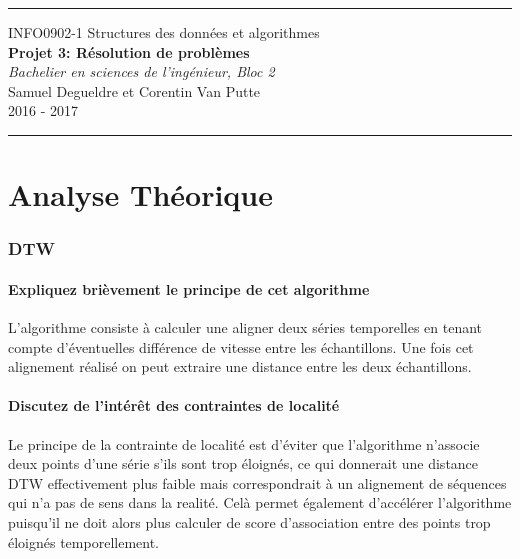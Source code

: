 \documentclass[a4paper,11pt]{article}
\begin{document}
\setcounter{page}{1}


\begin{center}


\rule{\linewidth}{0.3mm}
\LARGE
INFO0902-1 Structures des données et algorithmes\\
\vspace{0.3cm}
\large
\textbf{Projet 3: Résolution de problèmes}\\
\vspace{0.3cm}
\normalsize
\textit{Bachelier en sciences de l'ingénieur, Bloc 2}\\
\vspace{0.2cm}
Samuel Degueldre et Corentin Van Putte\\
\vspace{0.2cm}
2016 - 2017\\
\LARGE
\rule{\linewidth}{0.3mm}
 

\end{center}
\part{Analyse Théorique}


\section{DTW}
\subsection{Expliquez brièvement le principe de cet algorithme}

L’algorithme consiste à calculer une aligner deux séries temporelles en tenant compte d’éventuelles différence de vitesse entre les échantillons. Une fois cet alignement réalisé on peut extraire une distance entre les deux échantillons.

\subsection{Discutez de l'intérêt des contraintes de localité}

Le principe de la contrainte de localité est d’éviter que l’algorithme n’associe deux points d’une série s’ils sont trop éloignés, ce qui donnerait une distance DTW effectivement plus faible mais correspondrait à un alignement de séquences qui n’a pas de sens dans la realité. Celà permet également d’accélérer l’algorithme puisqu’il ne doit alors plus calculer de score d’association entre des points trop éloignés temporellement.
\end{document}
